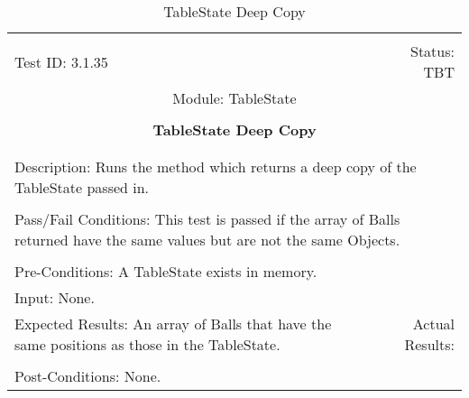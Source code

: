 \documentclass[titlepage]{article}
\begin{document}
\begin{center}%
\begin{table}[h!]
\begin{tabular}{|l r|}\hline&\\[-2mm]
	Test ID: 3.1.35	&Status: TBT\\[-3mm]
	\multicolumn{2}{|c|}{Module: TableState}\\&\\
	\multicolumn{2}{|c|}{\textbf{\large{TableState Deep Copy}}}\\&\\\hline&\\[-3mm]
	\multicolumn{2}{|p{\textwidth}|}{Description: Runs the method which returns a deep copy of the TableState passed in.}\\[1mm]\hline&\\[-3mm]
	\multicolumn{2}{|p{\textwidth}|}{Pass/Fail Conditions: This test is passed if the array of Balls returned have the same values but are not the same Objects.}\\[1mm]\hline&\\[-3mm]
	\multicolumn{2}{|p{\textwidth}|}{Pre-Conditions: A TableState exists in memory.}\\[4mm]
	\multicolumn{2}{|p{\textwidth}|}{Input: None.}\\[2mm]\hline
	\multicolumn{1}{|p{0.49\textwidth}}{Expected Results: An array of Balls that have the same positions as those in the TableState.}	&\multicolumn{1}{|p{0.45\textwidth}|}{Actual Results: }\\\hline&\\[-3mm]
	\multicolumn{2}{|p{\textwidth}|}{Post-Conditions: None.}\\\hline
\end{tabular}
\caption{TableState Deep Copy}
\end{table}
\end{center}
\newpage
\end{document}
